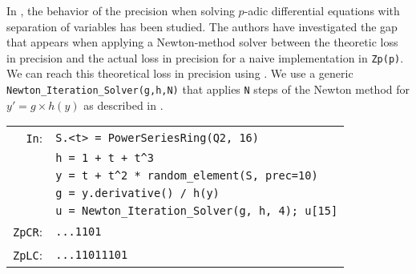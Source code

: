 \documentclass[sigconf]{acmart}
\newcommand{\ZpL}{\text{\color{output} \rm \tt ZpL}\xspace}
\newcommand{\cIn}{{\color{input} \tt \phantom{Zp}In}:}
\newcommand{\cZpCR}{{\color{output} \tt ZpCR}:}
\newcommand{\cZpLC}{{\color{output} \tt ZpLC}:}
\theoremstyle{definition}
\begin{document}
In \cite{LV16}, the behavior of the precision when solving
$p$-adic differential equations with separation of 
variables has been studied.
The authors have investigated the gap that appears
when applying a Newton-method solver between
the theoretic loss in precision and the 
actual loss in precision for a naive implementation in \verb?Zp(p)?.
We can reach this theoretical loss in precision using \ZpL.
We use a generic {\color{function}\verb?Newton_Iteration_Solver?}\verb?(g,h,N)?
that applies \verb?N? steps of the Newton method for 
$y'=g \times h(y)$ as described in \cite{LV16}.

\smallskip

{\noindent \small
\begin{tabular}{rl}
\cIn
 & \verb?S.<t> = ?{\color{constructor}\verb?PowerSeriesRing?}\verb?(?{\color{ring}\verb?Q2?}\verb?, 16)? \\
 & \verb?h = 1 + t + t^3? \\
 & \verb?y = t + t^2 * ?{\color{function}\verb?random_element?}\verb?(S, prec=10)? \\
 & \verb?g = y.derivative() / h(y)? \\
 & \verb?u = ?{\color{function}\verb?Newton_Iteration_Solver?}\verb?(g, h, 4); u[15]? \\
\cZpCR
 & \verb?...1101? \\
\cZpLC
 & \verb?...11011101? \\
\end{tabular}}

\end{document}
